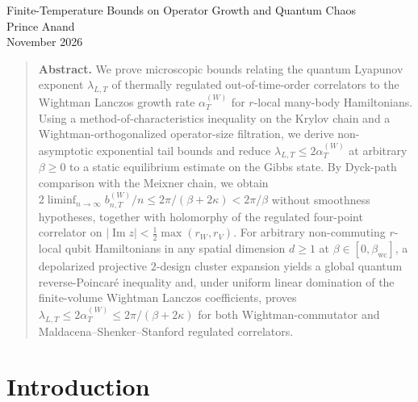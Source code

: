 \documentclass[11pt,a4paper]{article}
\numberwithin{equation}{section}
\theoremstyle{plain}
\theoremstyle{definition}
\begin{document}
\begin{center}
  {\LARGE Finite-Temperature Bounds on Operator Growth and Quantum Chaos}\\[12pt]
  {\large Prince Anand}\\[4pt]
  {\normalsize November 2026}
\end{center}

\vspace{4pt}
\begin{quote}\small
\noindent\textbf{Abstract.}
We prove microscopic bounds relating the quantum Lyapunov exponent $\lambda_{L,T}$ of thermally regulated out-of-time-order correlators to the Wightman Lanczos growth rate $\alpha_T^{(W)}$ for $r$-local many-body Hamiltonians. Using a method-of-characteristics inequality on the Krylov chain and a Wightman-orthogonalized operator-size filtration, we derive non-asymptotic exponential tail bounds and reduce $\lambda_{L,T}\le 2\alpha_T^{(W)}$ at arbitrary $\beta\ge 0$ to a static equilibrium estimate on the Gibbs state. By Dyck-path comparison with the Meixner chain, we obtain $2\liminf_{n\to\infty} b_{n,T}^{(W)}/n \le 2\pi/(\beta+2\kappa) < 2\pi/\beta$ without smoothness hypotheses, together with holomorphy of the regulated four-point correlator on $|\operatorname{Im}z|<\frac{1}{2}\max(r_W,r_V)$. For arbitrary non-commuting $r$-local qubit Hamiltonians in any spatial dimension $d\ge 1$ at $\beta\in[0,\beta_{\mathrm{wc}}]$, a depolarized projective $2$-design cluster expansion yields a global quantum reverse-Poincar\'e inequality and, under uniform linear domination of the finite-volume Wightman Lanczos coefficients, proves $\lambda_{L,T}\le 2\alpha_T^{(W)}\le 2\pi/(\beta+2\kappa)$ for both Wightman-commutator and Maldacena--Shenker--Stanford regulated correlators.
\end{quote}

\vspace{6pt}

\section{Introduction}\label{sec:intro}
\end{document}
